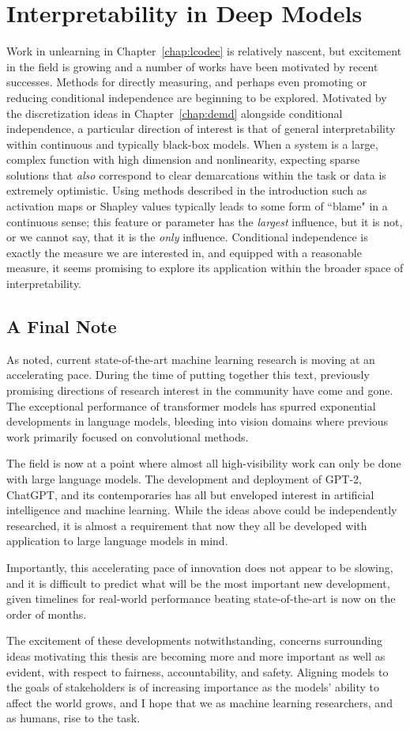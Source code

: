 \section{Interpretability in Deep Models}\label{sec:latents}
Work in unlearning in Chapter~\ref{chap:lcodec} is relatively nascent,
but excitement in the field is growing
and a number of works have been motivated
by recent successes.
Methods for directly measuring, and perhaps
even promoting or reducing conditional
independence are beginning to be explored.
Motivated by the discretization ideas
in Chapter~\ref{chap:demd} alongside
conditional independence,
a particular direction of interest
is that of general interpretability 
within continuous and typically
black-box models.
When a system is a large,
complex function with high dimension
and nonlinearity,
expecting sparse solutions
that \textit{also} correspond
to clear demarcations within the task or 
data is extremely optimistic.
Using methods described in the introduction
such as activation maps
or Shapley values typically 
leads to some form of ``blame"
in a continuous sense;
this feature or parameter
has the \textit{largest} influence,
but it is not, or we cannot say,
that it is the \textit{only} influence.
Conditional independence is exactly
the measure we are interested in,
and equipped with a reasonable measure,
it seems promising to explore its
application within the broader space of
interpretability.

\subsection{A Final Note}
As noted, current state-of-the-art
machine learning research
is moving at an accelerating pace.
During the time of putting
together this text,
previously promising directions
of research interest in the community
have come and gone.
The exceptional performance
of transformer models
has spurred exponential developments
in language models,
bleeding into vision domains
where previous work primarily
focused on convolutional methods.

The field is now at a point
where almost all high-visibility
work can only be done
with large language models.
The development and deployment
of GPT-2, ChatGPT, and its contemporaries
has all but enveloped interest
in artificial intelligence and machine learning.
While the ideas above could be independently
researched,
it is almost a requirement that now they 
all be developed with application to large
language models in mind.

Importantly, this accelerating pace
of innovation does not appear to be slowing,
and it is difficult to predict
what will be the most important
new development, given timelines
for real-world performance beating
state-of-the-art is now on the order of months.

The excitement of these developments notwithstanding,
concerns surrounding ideas motivating this thesis
are becoming more and more important as well
as evident, with respect to fairness,
accountability, and safety.
Aligning models to the goals of stakeholders
is of increasing importance as the models'
ability to affect the world grows,
and I hope that we as machine learning
researchers, and as humans, rise to the task.